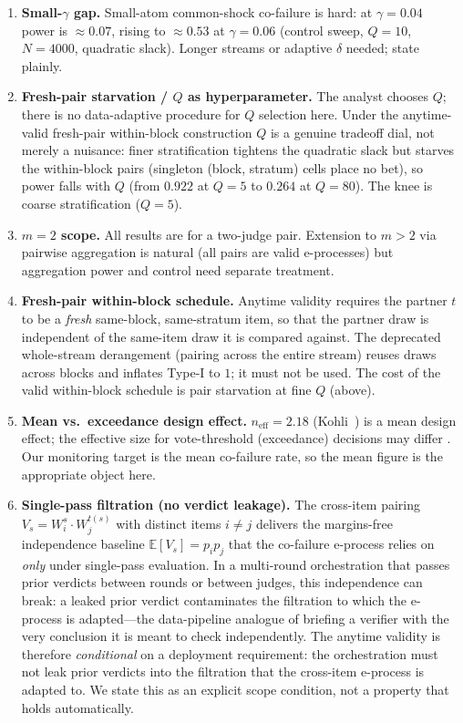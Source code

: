 \documentclass{article}
\begin{document}
\begin{enumerate}
  \item \textbf{Small-$\gamma$ gap.} Small-atom common-shock co-failure is hard:
  at $\gamma=0.04$ power is $\approx 0.07$, rising to $\approx 0.53$ at
  $\gamma=0.06$ (control sweep, $Q=10$, $N=4000$, quadratic slack). Longer
  streams or adaptive $\delta$ needed; state plainly.
  \item \textbf{Fresh-pair starvation / $Q$ as hyperparameter.} The analyst
  chooses $Q$; there is no data-adaptive procedure for $Q$ selection here. Under
  the anytime-valid fresh-pair within-block construction $Q$ is a genuine
  tradeoff dial, not merely a nuisance: finer stratification tightens the
  quadratic slack but starves the within-block pairs (singleton (block, stratum)
  cells place no bet), so power falls with $Q$ (from $0.922$ at $Q=5$ to $0.264$
  at $Q=80$). The knee is coarse stratification ($Q=5$).
  \item \textbf{$m=2$ scope.} All results are for a two-judge pair. Extension to
  $m>2$ via pairwise aggregation is natural (all pairs are valid e-processes) but
  aggregation power and control need separate treatment.
  \item \textbf{Fresh-pair within-block schedule.} Anytime validity requires the
  partner $t$ to be a \emph{fresh} same-block, same-stratum item, so that the
  partner draw is independent of the same-item draw it is compared against. The
  deprecated whole-stream derangement (pairing across the entire stream) reuses
  draws across blocks and inflates Type-I to $1$; it must not be used. The cost
  of the valid within-block schedule is pair starvation at fine $Q$ (above).
  \item \textbf{Mean vs.\ exceedance design effect.} $n_{\mathrm{eff}} = 2.18$
  (Kohli~\citep{kohli2605}) is a mean design effect; the effective size for
  vote-threshold (exceedance) decisions may differ \citep{noonan2608}.
  Our monitoring target is the mean co-failure rate, so the mean figure is
  the appropriate object here.
  \item \textbf{Single-pass filtration (no verdict leakage).} The cross-item
  pairing $V_s = W_i^s \cdot W_j^{t(s)}$ with distinct items $i \ne j$ delivers
  the margins-free independence baseline $\mathbb{E}[V_s]=p_i p_j$ that the
  co-failure e-process relies on \emph{only} under single-pass evaluation. In a
  multi-round orchestration that passes prior verdicts between rounds or between
  judges, this independence can break: a leaked prior verdict contaminates the
  filtration to which the e-process is adapted---the data-pipeline analogue of
  briefing a verifier with the very conclusion it is meant to check
  independently. The anytime validity is therefore \emph{conditional} on a
  deployment requirement: the orchestration must not leak prior verdicts into
  the filtration that the cross-item e-process is adapted to. We state this as
  an explicit scope condition, not a property that holds automatically.
\end{enumerate}
\end{document}
